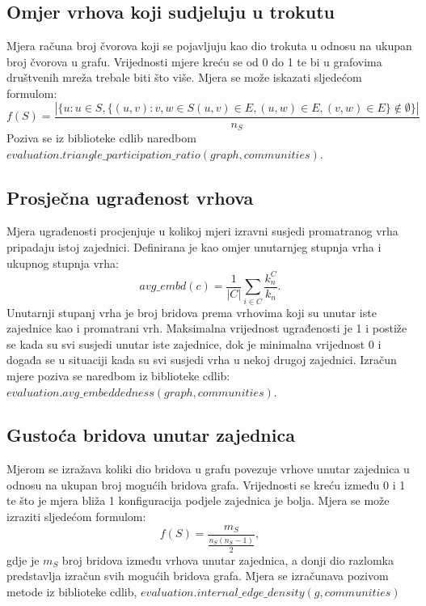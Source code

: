 \pagebreak
\subsection{Omjer vrhova koji sudjeluju u trokutu}
Mjera računa broj čvorova koji se pojavljuju kao dio trokuta u odnosu na ukupan broj čvorova u grafu. Vrijednosti mjere kreću se od 0 do 1 te bi u grafovima društvenih mreža trebale biti što više. Mjera se može iskazati sljedećom formulom:
\begin{equation}
	f(S) = \frac{| \{ u : u \in S, \{(u,v):v, w \in S (u,v) \in E, (u,w) \in E, (v,w) \in E \}  \notin \emptyset \} | }{n_{S}}
\end{equation}
Poziva se iz biblioteke cdlib naredbom \\ $evaluation.triangle\_participation\_ratio(graph, communities).$


\subsection{Prosječna ugrađenost vrhova}
Mjera ugrađenosti procjenjuje u kolikoj mjeri izravni susjedi promatranog vrha pripadaju istoj zajednici. Definirana je kao omjer unutarnjeg stupnja vrha i ukupnog stupnja vrha: 
\begin{equation}
	avg\_embd(c) = \frac{1}{|C|} \sum_{i \in C} \frac{k_{n}^{C}}{k_{n}}.
\end{equation}
Unutarnji stupanj vrha je broj bridova prema vrhovima koji su unutar iste zajednice kao i promatrani vrh. Maksimalna vrijednost ugrađenosti je 1 i postiže se kada su svi susjedi unutar iste zajednice, dok je minimalna vrijednost 0 i događa se u situaciji kada su svi susjedi vrha u nekoj drugoj zajednici. Izračun mjere poziva se naredbom iz biblioteke cdlib: $evaluation.avg\_embeddedness(graph,communities)$.


\subsection{Gustoća bridova unutar zajednica}
Mjerom se izražava koliki dio bridova u grafu povezuje vrhove unutar zajednica u odnosu na ukupan broj mogućih bridova grafa. Vrijednosti se kreću između 0 i 1 te što je mjera bliža 1 konfiguracija podjele zajednica je bolja. Mjera se može izraziti sljedećom formulom:
\begin{equation}
	f(S) = \frac{m_{S}}{\frac{n_{S}(n_{S} - 1)}{2}},
\end{equation}
gdje je $m_{S}$ broj bridova između vrhova unutar zajednica, a donji dio razlomka predstavlja izračun svih mogućih bridova grafa. Mjera se izračunava pozivom metode iz biblioteke cdlib, $evaluation.internal\_edge\_density(g,communities)$


